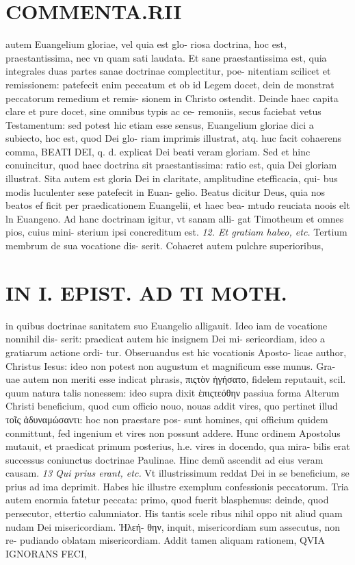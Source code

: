\documentclass{article}
\begin{document}
\begin{pages}
\section*{COMMENTA.RII }\pstart autem Euangelium gloriae, vel quia est glo- riosa doctrina, hoc est, praestantissima, nec vn quam sati laudata.  \pend\pstart Et sane praestantissima est, quia integrales duas partes sanae doctrinae complectitur, poe- nitentiam scilicet et remissionem: patefecit enim peccatum et ob id Legem docet, dein de monstrat peccatorum remedium et remis- sionem in Christo ostendit. Deinde haec capita clare et pure docet, sine omnibus typis ac ce- remoniis, secus faciebat vetus Testamentum: sed potest hic etiam esse sensus, Euangelium gloriae dici a subiecto, hoc est, quod Dei glo- riam imprimis illustrat, atq. huc facit cohaerens comma, BEATI DEI, q. d. explicat Dei beati veram gloriam. Sed et hinc conuincitur, quod haec doctrina sit praestantissima: ratio est, quia Dei gloriam illustrat. Sita autem est gloria Dei in claritate, amplitudine etefficacia, qui- bus modis luculenter sese patefecit in Euan- gelio. Beatus dicitur Deus, quia nos beatos ef ficit per praedicationem Euangelii, et haec bea- mtudo reuciata noois elt ln Euangeno.  \pend\pstart Ad hanc doctrinam igitur, vt sanam alli- gat Timotheum et omnes pios, cuius mini- sterium ipsi concreditum est.  \pend
\textit{12. Et gratiam habeo, etc. }\pstart Tertium membrum de sua vocatione dis- serit. Cohaeret autem pulchre superioribus,  \pend
\section*{IN I. EPIST. AD TI MOTH. }
\marginpar{[ p.31 ]}\pstart in quibus doctrinae sanitatem suo Euangelio alligauit. Ideo iam de vocatione nonnihil dis- serit: praedicat autem hic insignem Dei mi- sericordiam, ideo a gratiarum actione ordi- tur. Obseruandus est hic vocationis Aposto- licae author, Christus Iesus: ideo non potest non augustum et magnificum esse munus. Gra- uae autem non meriti esse indicat phrasis, πιςτὸν ἡγήσατο, fidelem reputauit, scil. quum natura talis nonessem: ideo supra dixit ἑπιςτεόθην passiua forma Alterum Christi beneficium, quod cum officio nouo, nouas addit vires, quo pertinet illud τοῖς ἀδυναμώσαντι: hoc non praestare pos- sunt homines, qui officium quidem conmittunt, fed ingenium et vires non possunt addere. Hunc ordinem Apostolus mutauit, et praedicat primum posterius, h.e. vires in docendo, qua mira- bilis erat successus coniunctus doctrinae Paulinae. Hinc demũ ascendit ad eius veram causam.  \pend
\textit{13 Qui prius erant, etc. }\pstart Vt illustrissimum reddat Dei in se beneficium, se prius ad ima deprimit. Habes hic illustre exemplum confessionis peccatorum. Tria autem enormia fatetur peccata: primo, quod fuerit blasphemus: deinde, quod persecutor, ettertio calumniator. His tantis scele ribus nihil oppo nit aliud quam nudam Dei misericordiam. Ἠλεή- θην, inquit, misericordiam sum assecutus, non re- pudiando oblatam misericordiam. Addit tamen aliquam rationem, QVIA IGNORANS FECI,  \pend
\marginpar{[ p.32 ]}

\end{pages}
\end{document}
